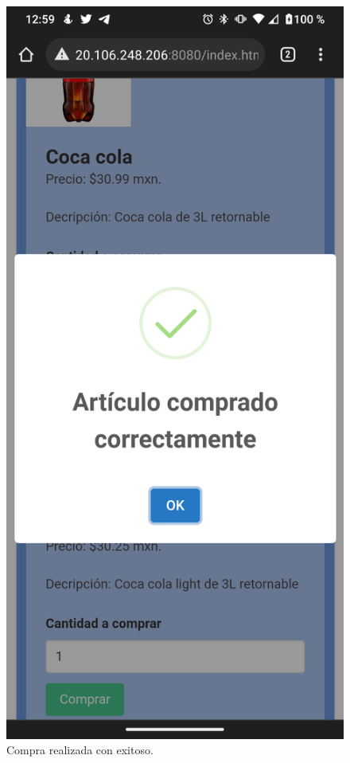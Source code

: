 \documentclass[11pt]{article}
\begin{document}
		\begin{figure}[H]
			\centering
			\includegraphics[scale=0.27]{resources/Screenshot_20211113-005957.png}
			\caption{Compra realizada con exitoso.}\label{fig:picture}
		\end{figure}
\end{document}
